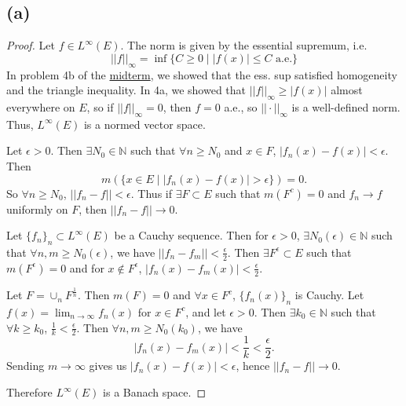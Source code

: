 \documentclass{article}
\newcommand{\N}{\mathbb{N}} %
\begin{document}
\subsection*{(a)}
\begin{proof}
	Let $f \in L^{\infty}(E)$. The norm is given by the essential supremum, i.e.
	\begin{equation}
		||f||_{\infty} = \inf \{C \geq 0 \;|\; |f(x)| \leq C \textrm{ a.e.}\}
	\end{equation}
	In problem 4b of the \href{https://github.com/ovega14/FunctionalAnalysis_solutions/blob/main/midterm/18.102_midterm.pdf}{midterm}, we showed that the ess. sup satisfied homogeneity and the triangle inequality. In 4a, we showed that $||f||_{\infty} \geq |f(x)|$ almost everywhere on $E$, so if $||f||_{\infty} = 0$, then $f=0$ a.e., so $||\cdot||_{\infty}$ is a well-defined norm. Thus, $L^{\infty}(E)$ is a normed vector space.
	
	Let $\epsilon > 0$. Then $\exists N_0 \in \N$ such that $\forall n \geq N_0$ and $x \in F$, $|f_n(x) - f(x)| < \epsilon$. Then 
	\begin{equation}
		m(\{x \in E \;|\; |f_n(x) - f(x)| > \epsilon\}) = 0.
	\end{equation} 
	So $\forall n \geq N_0$, $||f_n - f|| < \epsilon$. Thus if $\exists F \subset E$ such that $m(F^c) = 0$ and $f_n \to f$ uniformly on $F$, then $||f_n - f|| \to 0$.
	
	Let $\{f_n\}_n \subset L^{\infty}(E)$ be a Cauchy sequence. Then for $\epsilon > 0$, $\exists N_0(\epsilon) \in \N$ such that $\forall n, m \geq N_0(\epsilon)$, we have $||f_n - f_m|| < \frac{\epsilon}{2}$. Then $\exists F^{\epsilon} \subset E$ such that $m(F^{\epsilon}) = 0$ and for $x \notin F^{\epsilon}$, $|f_n(x) - f_m(x)| < \frac{\epsilon}{2}$.
	
	Let $F = \cup_n F^{\frac{1}{n}}$. Then $m(F) = 0$ and $\forall x \in F^c$, $\{f_n(x)\}_n$ is Cauchy. Let $f(x) = \lim_{n \to \infty} f_n(x)$ for $x \in F^c$, and let $\epsilon > 0$. Then $\exists k_0 \in \N$ such that $\forall k \geq k_0$, $\frac{1}{k} < \frac{\epsilon}{2}$. Then $\forall n, m \geq N_0(k_0)$, we have
	\begin{equation}
		|f_n(x) - f_m(x)| < \frac{1}{k} < \frac{\epsilon}{2}.
	\end{equation}
	Sending $m \to \infty$ gives us $|f_n(x) - f(x)| < \epsilon$, hence $||f_n - f|| \to 0$.
	
	Therefore $L^{\infty}(E)$ is a Banach space.
\end{proof}
\end{document}
